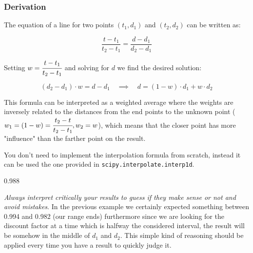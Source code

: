\begin{attention}
\subsubsection{Derivation}
The equation of a line for two points $(t_1, d_1)$ and $(t_2, d_2)$ can be written as:

\begin{equation}
\frac{t - t_1}{t_2 - t_1} = \frac{d - d_1}{d_2 - d_1}
\end{equation}

Setting $w = \cfrac{t - t_1}{t_2 - t_1}$ and solving for $d$ we find the desired solution:

\begin{equation}
(d_2 - d_1)\cdot w = d - d_1\quad\implies\quad d = (1 - w)\cdot d_1 + w \cdot d_2
\end{equation}

This formula can be interpreted as a weighted average where the weights are inversely related to the distances from the end points to the unknown point ($w_1 = (1 - w) = \cfrac{t_2 - t}{t_2 -t_1}, w_2 = w$), which means that the closer point has more "influence" than the farther point on the result.
\end{attention}

You don't need to implement the interpolation formula from scratch, instead it can be used the one provided in \texttt{scipy.interpolate.interp1d}. 


\begin{ioutput}
0.988
\end{ioutput}

\emph{Always interpret critically your results to guess if they make sense or not and avoid mistakes}. In the previous example we certainly expected something between 0.994 and 0.982 (our range ends) furthermore since we are looking for the discount factor at a time which is halfway the considered interval, the result will be somehow in the middle of $d_1$ and $d_2$. This simple kind of reasoning should be applied every time you have a result to quickly judge it.

